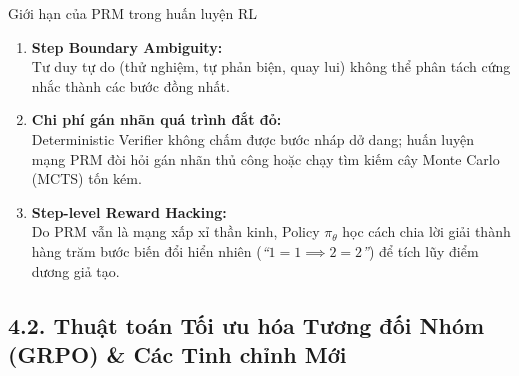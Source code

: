 \begin{frame}{Giới hạn của PRM trong huấn luyện RL}
  \small
  \begin{enumerate}\setlength{\itemsep}{4pt}
    \item \textbf{Step Boundary Ambiguity:}\\
      \small Tư duy tự do (thử nghiệm, tự phản biện, quay lui) không thể phân tách cứng nhắc thành các bước đồng nhất.
    \item \textbf{Chi phí gán nhãn quá trình đắt đỏ:}\\
      \small Deterministic Verifier không chấm được bước nháp dở dang; huấn luyện mạng PRM đòi hỏi gán nhãn thủ công hoặc chạy tìm kiếm cây Monte Carlo (MCTS) tốn kém.
    \item \textbf{Step-level Reward Hacking:}\\
      \small Do PRM vẫn là mạng xấp xỉ thần kinh, Policy $\pi_\theta$ học cách chia lời giải thành hàng trăm bước biến đổi hiển nhiên (\textit{``$1=1 \implies 2=2$''}) để tích lũy điểm dương giả tạo.
  \end{enumerate}
  \par\vspace{0pt}
\end{frame}

\subsection{4.2. Thuật toán Tối ưu hóa Tương đối Nhóm (GRPO) \& Các Tinh chỉnh Mới}

